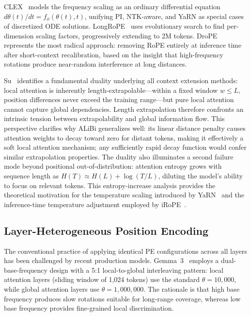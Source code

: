 CLEX~\cite{chen2024clex} models the frequency scaling as an ordinary differential equation $d\theta(t)/dt = f_\phi(\theta(t), t)$, unifying PI, NTK-aware, and YaRN as special cases of discretized ODE solutions. LongRoPE~\cite{ding2024longrope} uses evolutionary search to find per-dimension scaling factors, progressively extending to 2M tokens. DroPE~\cite{gelberg2026drope} represents the most radical approach: removing RoPE entirely at inference time after short-context recalibration, based on the insight that high-frequency rotations produce near-random interference at long distances.

Su~\cite{su2024roformer} identifies a fundamental duality underlying all context extension methods: local attention is inherently length-extrapolable---within a fixed window $w \leq L$, position differences never exceed the training range---but pure local attention cannot capture global dependencies. Length extrapolation therefore confronts an intrinsic tension between extrapolability and global information flow. This perspective clarifies why ALiBi generalizes well: its linear distance penalty causes attention weights to decay toward zero for distant tokens, making it effectively a soft local attention mechanism; any sufficiently rapid decay function would confer similar extrapolation properties. The duality also illuminates a second failure mode beyond positional out-of-distribution: attention entropy grows with sequence length as $H(T) \approx H(L) + \log(T/L)$, diluting the model's ability to focus on relevant tokens. This entropy-increase analysis provides the theoretical motivation for the temperature scaling introduced by YaRN~\cite{peng2023yarn} and the inference-time temperature adjustment employed by iRoPE~\cite{llama4_2025}.

\subsection{Layer-Heterogeneous Position Encoding}
\label{subsec:layer_hetero_pe}

The conventional practice of applying identical PE configurations across all layers has been challenged by recent production models. Gemma~3~\cite{gemma2025gemma3} employs a dual-base-frequency design with a 5:1 local-to-global interleaving pattern: local attention layers (sliding window of 1,024 tokens) use the standard $\theta = 10{,}000$, while global attention layers use $\theta = 1{,}000{,}000$. The rationale is that high base frequency produces slow rotations suitable for long-range coverage, whereas low base frequency provides fine-grained local discrimination.

